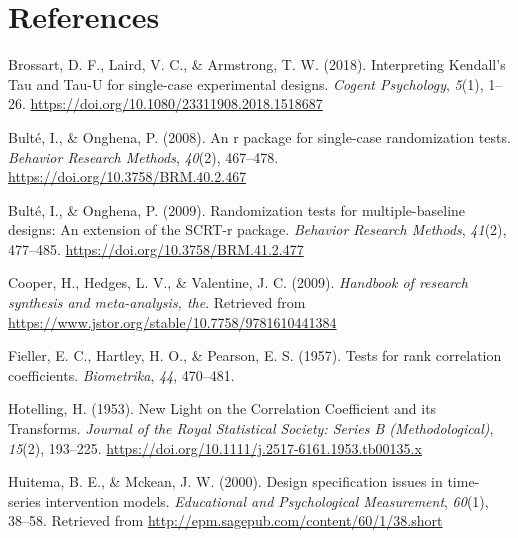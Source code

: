 \documentclass[
  letterpaper,
  DIV=11,
  numbers=noendperiod]{scrreprt}
\newlength{\cslhangindent}
\newlength{\cslentryspacingunit} %
\newenvironment{CSLReferences}[2] %
 {%
  \setlength{\parindent}{0pt}
  \ifodd #1
  \let\oldpar\par
  \def\par{\hangindent=\cslhangindent\oldpar}
  \fi
  \setlength{\parskip}{#2\cslentryspacingunit}
 }%
 {}
\begin{document}

\hypertarget{references}{%
\chapter*{References}\label{references}}


\hypertarget{refs}{}
\begin{CSLReferences}{1}{0}
\leavevmode{}%
Brossart, D. F., Laird, V. C., \& Armstrong, T. W. (2018). Interpreting
Kendall{'}s Tau and Tau-U for single-case experimental designs.
\emph{Cogent Psychology}, \emph{5}(1), 1--26.
\url{https://doi.org/10.1080/23311908.2018.1518687}

\leavevmode{}%
Bulté, I., \& Onghena, P. (2008). An r package for single-case
randomization tests. \emph{Behavior Research Methods}, \emph{40}(2),
467--478. \url{https://doi.org/10.3758/BRM.40.2.467}

\leavevmode{}%
Bulté, I., \& Onghena, P. (2009). Randomization tests for
multiple-baseline designs: An extension of the SCRT-r package.
\emph{Behavior Research Methods}, \emph{41}(2), 477--485.
\url{https://doi.org/10.3758/BRM.41.2.477}

\leavevmode{}%
Cooper, H., Hedges, L. V., \& Valentine, J. C. (2009). \emph{Handbook of
research synthesis and meta-analysis, the}. Retrieved from
\url{https://www.jstor.org/stable/10.7758/9781610441384}

\leavevmode{}%
Fieller, E. C., Hartley, H. O., \& Pearson, E. S. (1957). Tests for rank
correlation coefficients. \emph{Biometrika}, \emph{44}, 470--481.

\leavevmode{}%
Hotelling, H. (1953). New Light on the Correlation Coefficient and its
Transforms. \emph{Journal of the Royal Statistical Society: Series B
(Methodological)}, \emph{15}(2), 193--225.
\url{https://doi.org/10.1111/j.2517-6161.1953.tb00135.x}

\leavevmode{}%
Huitema, B. E., \& Mckean, J. W. (2000). Design specification issues in
time-series intervention models. \emph{Educational and Psychological
Measurement}, \emph{60}(1), 38--58. Retrieved from
\url{http://epm.sagepub.com/content/60/1/38.short}


\end{CSLReferences}
\end{document}
